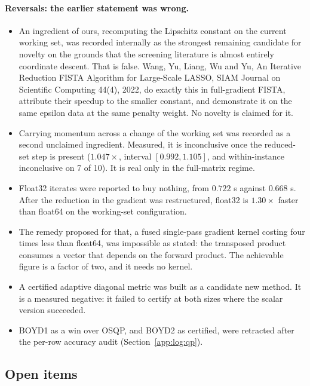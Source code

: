 \paragraph{Reversals: the earlier statement was wrong.}
\begin{itemize}
\item An ingredient of ours, recomputing the Lipschitz constant on the current
  working set, was recorded internally as the strongest remaining candidate for
  novelty on the grounds that the screening literature is almost entirely
  coordinate descent. That is false. Wang, Yu, Liang, Wu and Yu, An Iterative
  Reduction FISTA Algorithm for Large-Scale LASSO, SIAM Journal on Scientific
  Computing 44(4), 2022, do exactly this in full-gradient FISTA, attribute
  their speedup to the smaller constant, and demonstrate it on the same epsilon
  data at the same penalty weight. No novelty is claimed for it.
\item Carrying momentum across a change of the working set was recorded as a
  second unclaimed ingredient. Measured, it is inconclusive once the
  reduced-set step is present ($1.047\times$, interval $[0.992, 1.105]$, and
  within-instance inconclusive on 7 of 10). It is real only in the full-matrix
  regime.
\item Float32 iterates were reported to buy nothing, from $0.722$ s against
  $0.668$ s. After the reduction in the gradient was restructured, float32 is
  $1.30\times$ faster than float64 on the working-set configuration.
\item The remedy proposed for that, a fused single-pass gradient kernel
  costing four times less than float64, was impossible as stated: the
  transposed product consumes a vector that depends on the forward product. The
  achievable figure is a factor of two, and it needs no kernel.
\item A certified adaptive diagonal metric was built as a candidate new method.
  It is a measured negative: it failed to certify at both sizes where the
  scalar version succeeded.
\item BOYD1 as a win over OSQP, and BOYD2 as certified, were retracted after
  the per-row accuracy audit (Section~\ref{app:log:qp}).
\end{itemize}

\subsection{Open items}
\label{app:log:open}

